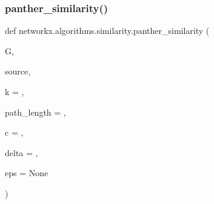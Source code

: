 \subsubsection{\texorpdfstring{panther\+\_\+similarity()}{panther\_similarity()}}
{\footnotesize\ttfamily def networkx.\+algorithms.\+similarity.\+panther\+\_\+similarity (\begin{DoxyParamCaption}\item[{}]{G,  }\item[{}]{source,  }\item[{}]{k = {},  }\item[{}]{path\+\_\+length = {},  }\item[{}]{c = {},  }\item[{}]{delta = {},  }\item[{}]{eps = {\ttfamily None} }\end{DoxyParamCaption})}

